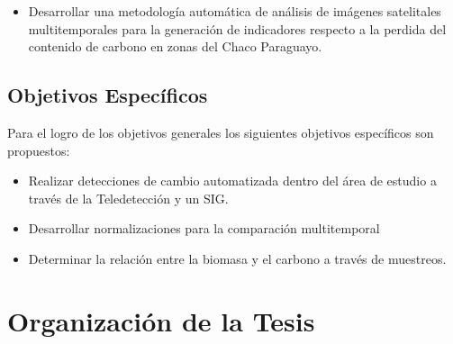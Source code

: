 \begin{itemize}
\item Desarrollar una metodolog\'ia autom\'atica de an\'alisis de im\'agenes satelitales multitemporales para la generaci\'on de indicadores respecto a la perdida del contenido de carbono en zonas del Chaco Paraguayo.
\end{itemize}
\subsection{Objetivos Específicos}
Para el logro de los objetivos generales los siguientes objetivos específicos son propuestos:
\begin{itemize}


\item Realizar detecciones de cambio automatizada dentro del \'area de estudio a trav\'es de la Teledetecci\'on y un SIG.   

\item Desarrollar normalizaciones para la comparaci\'on multi\textendash temporal
\item Determinar la relación entre la biomasa y el carbono a trav\'es de muestreos.
    


\end{itemize}



\section{Organización de la Tesis}

